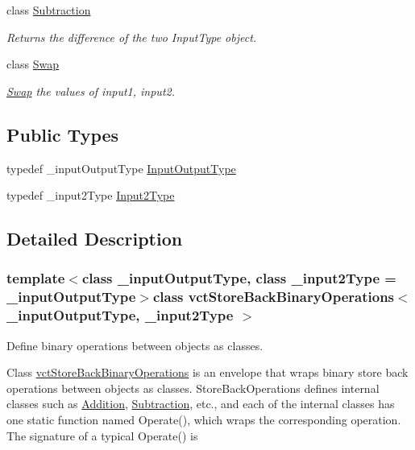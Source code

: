 \begin{DoxyCompactItemize}
class \hyperlink{classvct_store_back_binary_operations_1_1_subtraction}{Subtraction}
\begin{DoxyCompactList}\small\item\em Returns the difference of the two Input\+Type object. \end{DoxyCompactList}\item 
class \hyperlink{classvct_store_back_binary_operations_1_1_swap}{Swap}
\begin{DoxyCompactList}\small\item\em \hyperlink{classvct_store_back_binary_operations_1_1_swap}{Swap} the values of input1, input2. \end{DoxyCompactList}\end{DoxyCompactItemize}
\subsection*{Public Types}
\begin{DoxyCompactItemize}
\item 
typedef \+\_\+input\+Output\+Type \hyperlink{classvct_store_back_binary_operations_a9dc481d9e1345541dd5d833d5e5688f3}{Input\+Output\+Type}
\item 
typedef \+\_\+input2\+Type \hyperlink{classvct_store_back_binary_operations_a65a7197563c794a879fb50a406e70c8f}{Input2\+Type}
\end{DoxyCompactItemize}


\subsection{Detailed Description}
\subsubsection*{template$<$class \+\_\+input\+Output\+Type, class \+\_\+input2\+Type = \+\_\+input\+Output\+Type$>$class vct\+Store\+Back\+Binary\+Operations$<$ \+\_\+input\+Output\+Type, \+\_\+input2\+Type $>$}

Define binary operations between objects as classes. 

Class \hyperlink{classvct_store_back_binary_operations}{vct\+Store\+Back\+Binary\+Operations} is an envelope that wraps binary store back operations between objects as classes. Store\+Back\+Operations defines internal classes such as \hyperlink{classvct_store_back_binary_operations_1_1_addition}{Addition}, \hyperlink{classvct_store_back_binary_operations_1_1_subtraction}{Subtraction}, etc., and each of the internal classes has one static function named Operate(), which wraps the corresponding operation. The signature of a typical Operate() is


